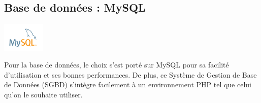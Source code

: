 \documentclass[12pt,a4paper]{article}
\begin{document}
\subsection{Base de données : MySQL}
\begin{center}
  \includegraphics[width=2cm]{img/mysql.png}
\end{center}
Pour la base de données, le choix s'est porté sur MySQL pour sa facilité d'utilisation et ses bonnes performances. 
De plus, ce Système de Gestion de Base de Données (SGBD) s'intègre facilement à un environnement PHP tel que celui qu'on le souhaite utiliser.





\end{document}
